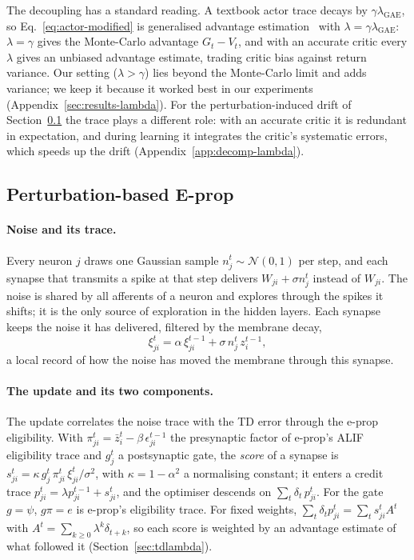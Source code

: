 \documentclass[10pt,twocolumn]{article}
\begin{document}
The decoupling has a standard reading. A textbook actor trace decays by
$\gamma\lambda_{\mathrm{GAE}}$, so Eq.~\eqref{eq:actor-modified} is generalised
advantage estimation~\citep{schulman2016gae} with $\lambda=\gamma\lambda_{\mathrm{GAE}}$:
$\lambda=\gamma$ gives the Monte-Carlo advantage $G_t-V_t$, and with an accurate
critic every $\lambda$ gives an unbiased advantage estimate, trading critic bias
against return variance. Our setting ($\lambda>\gamma$) lies beyond the
Monte-Carlo limit and adds variance; we keep it because it worked best in our
experiments (Appendix~\ref{sec:results-lambda}). For the perturbation-induced drift of
Section~\ref{sec:distributed} the trace plays a different role: with an accurate
critic it is redundant in expectation, and during learning it integrates the
critic's systematic errors, which speeds up the drift
(Appendix~\ref{app:decomp-lambda}).

\subsection{Perturbation-based E-prop}
\label{sec:distributed}

\paragraph{Noise and its trace.}
Every neuron $j$ draws one Gaussian sample $n^t_j\sim\mathcal{N}(0,1)$ per step,
and each synapse that transmits a spike at that step delivers $W_{ji}+\sigma
n^t_j$ instead of $W_{ji}$. The noise is shared by all afferents of a neuron and
explores through the spikes it shifts; it is the only source of exploration in
the hidden layers. Each synapse keeps the noise it has delivered, filtered by the
membrane decay,
\begin{equation}
\xi^t_{ji}=\alpha\,\xi^{t-1}_{ji}+\sigma\,n^t_j\,z^{t-1}_i ,
\label{eq:perturbation-trace}
\end{equation}
a local record of how the noise has moved the membrane through this synapse.

\paragraph{The update and its two components.}
The update correlates the noise trace with the TD error through the
e-prop eligibility. With $\pi^t_{ji}=\bar z^t_i-\beta\,\epsilon^{t-1}_{ji}$ the
presynaptic factor of e-prop's ALIF eligibility trace and $g^t_j$ a postsynaptic
gate, the \emph{score} of a synapse is
$s^t_{ji}=\kappa\,g^t_j\,\pi^t_{ji}\,\xi^t_{ji}/\sigma^2$, with
$\kappa=1-\alpha^2$ a normalising constant; it enters a credit trace
$p^t_{ji}=\lambda p^{t-1}_{ji}+s^t_{ji}$, and the optimiser descends on
$\sum_t\delta_t\,p^t_{ji}$. For the gate $g=\psi$, $g\pi=e$ is e-prop's
eligibility trace. For fixed weights,
$\sum_t\delta_tp^t_{ji}=\sum_t s^t_{ji}A^t$ with
$A^t=\sum_{k\ge0}\lambda^k\delta_{t+k}$, so each score is weighted by an advantage
estimate of what followed it (Section~\ref{sec:tdlambda}).
\end{document}
